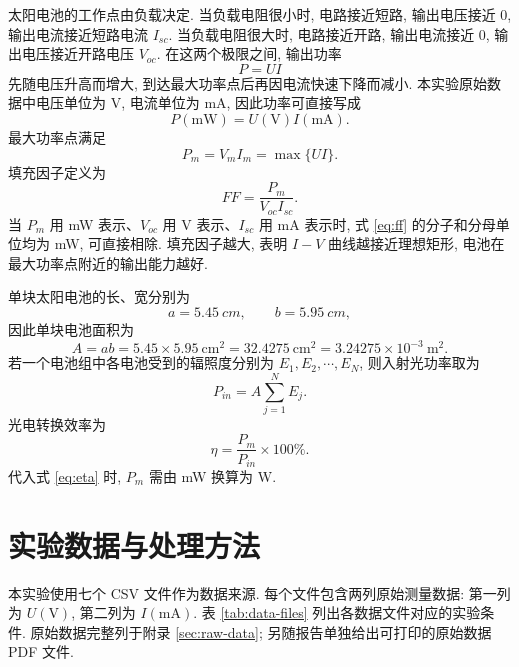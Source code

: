\documentclass[UTF8,a4paper,12pt]{ctexart}
\begin{document}
太阳电池的工作点由负载决定. 当负载电阻很小时, 电路接近短路, 输出电压接近 $0$, 输出电流接近短路电流 $I_{sc}$. 当负载电阻很大时, 电路接近开路, 输出电流接近 $0$, 输出电压接近开路电压 $V_{oc}$. 在这两个极限之间, 输出功率
\begin{equation}
    P=UI
\end{equation}
先随电压升高而增大, 到达最大功率点后再因电流快速下降而减小. 本实验原始数据中电压单位为 V, 电流单位为 mA, 因此功率可直接写成
\begin{equation}
    P(\mathrm{mW})=U(\mathrm{V})I(\mathrm{mA}).
\end{equation}
最大功率点满足
\begin{equation}
    P_m=V_mI_m=\max\{UI\}.
\end{equation}
填充因子定义为
\begin{equation}
    FF=\frac{P_m}{V_{oc}I_{sc}}.
    \label{eq:ff}
\end{equation}
当 $P_m$ 用 mW 表示、$V_{oc}$ 用 V 表示、$I_{sc}$ 用 mA 表示时, 式 \eqref{eq:ff} 的分子和分母单位均为 mW, 可直接相除. 填充因子越大, 表明 $I-V$ 曲线越接近理想矩形, 电池在最大功率点附近的输出能力越好.

单块太阳电池的长、宽分别为
\begin{equation}
    a=\SI{5.45}{cm},\qquad b=\SI{5.95}{cm},
\end{equation}
因此单块电池面积为
\begin{equation}
    A=ab=5.45\times 5.95\ \mathrm{cm^2}=32.4275\ \mathrm{cm^2}=3.24275\times 10^{-3}\ \mathrm{m^2}.
    \label{eq:area}
\end{equation}
若一个电池组中各电池受到的辐照度分别为 $E_1,E_2,\cdots,E_N$, 则入射光功率取为
\begin{equation}
    P_{in}=A\sum_{j=1}^{N}E_j.
    \label{eq:pin}
\end{equation}
光电转换效率为
\begin{equation}
    \eta=\frac{P_m}{P_{in}}\times 100\%.
    \label{eq:eta}
\end{equation}
代入式 \eqref{eq:eta} 时, $P_m$ 需由 mW 换算为 W.

\section{实验数据与处理方法}

本实验使用七个 CSV 文件作为数据来源. 每个文件包含两列原始测量数据: 第一列为 $U(\mathrm{V})$, 第二列为 $I(\mathrm{mA})$. 表 \ref{tab:data-files} 列出各数据文件对应的实验条件. 原始数据完整列于附录 \ref{sec:raw-data}; 另随报告单独给出可打印的原始数据 PDF 文件.
\end{document}
